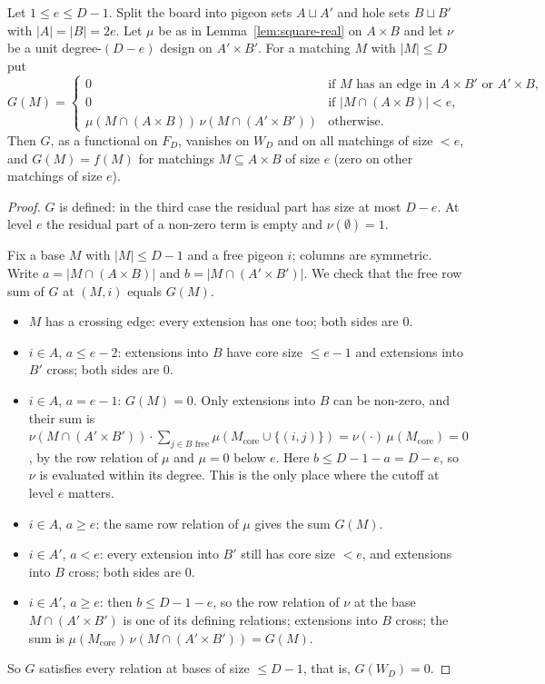\begin{lemma}\label{lem:tensor}
Let $1\le e\le D-1$.  Split the board into pigeon sets $A\sqcup A'$ and hole sets
$B\sqcup B'$ with $|A|=|B|=2e$.  Let $\mu$ be as in Lemma~\ref{lem:square-real} on
$A\times B$ and let $\nu$ be a unit degree-$(D-e)$ design on $A'\times B'$.  For a matching
$M$ with $|M|\le D$ put
\[
  G(M)=\begin{cases}
  0 & \text{if $M$ has an edge in $A\times B'$ or $A'\times B$,}\\
  0 & \text{if $|M\cap(A\times B)|<e$,}\\
  \mu(M\cap(A\times B))\,\nu(M\cap(A'\times B')) & \text{otherwise.}
  \end{cases}
\]
Then $G$, as a functional on $F_D$, vanishes on $W_D$ and on all matchings of size $<e$,
and $G(M)=f(M)$ for matchings $M\subseteq A\times B$ of size $e$ (zero on other matchings of
size $e$).
\end{lemma}

\begin{proof}
$G$ is defined: in the third case the residual part has size at most $D-e$.  At level $e$
the residual part of a non-zero term is empty and $\nu(\emptyset)=1$.

Fix a base $M$ with $|M|\le D-1$ and a free pigeon $i$; columns are symmetric.  Write
$a=|M\cap(A\times B)|$ and $b=|M\cap(A'\times B')|$.  We check that the free row sum of $G$
at $(M,i)$ equals $G(M)$.
\begin{itemize}
\item $M$ has a crossing edge: every extension has one too; both sides are $0$.
\item $i\in A$, $a\le e-2$: extensions into $B$ have core size $\le e-1$ and extensions into
  $B'$ cross; both sides are $0$.
\item $i\in A$, $a=e-1$: $G(M)=0$.  Only extensions into $B$ can be non-zero, and their sum is
  $\nu(M\cap(A'\times B'))\cdot\sum_{j\in B\text{ free}}\mu(M_{\mathrm{core}}\cup\{(i,j)\})
  =\nu(\cdot)\,\mu(M_{\mathrm{core}})=0$, by the row relation of $\mu$ and $\mu=0$ below $e$.
  Here $b\le D-1-a=D-e$, so $\nu$ is evaluated within its degree.  This is the only place
  where the cutoff at level $e$ matters.
\item $i\in A$, $a\ge e$: the same row relation of $\mu$ gives the sum $G(M)$.
\item $i\in A'$, $a<e$: every extension into $B'$ still has core size $<e$, and extensions
  into $B$ cross; both sides are $0$.
\item $i\in A'$, $a\ge e$: then $b\le D-1-e$, so the row relation of $\nu$ at the base
  $M\cap(A'\times B')$ is one of its defining relations; extensions into $B$ cross; the sum
  is $\mu(M_{\mathrm{core}})\,\nu(M\cap(A'\times B'))=G(M)$.
\end{itemize}
So $G$ satisfies every relation at bases of size $\le D-1$, that is, $G(W_D)=0$.
\end{proof}

